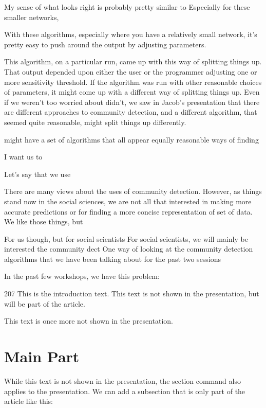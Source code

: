 My sense of what looks right is probably pretty similar to Especially for these smaller networks, 

With these algorithms, especially where you have a
relatively small network, it's pretty easy to push around the
output by adjusting parameters. 

This algorithm, on a particular run, came up with
this way of splitting things up. That output depended upon either the
user or the programmer adjusting one or more sensitivity threshold. If
the algorithm was run with other reasonable choices of parameters, it
might come up with a different way of splitting things up. Even if we weren't too worried about 
didn't, we saw in Jacob's presentation that there are different
approaches to community detection, and a different algorithm, that
seemed quite reasonable, might split things up differently.



 might have a set of algorithms that all appear equally reasonable ways of finding 






I want us to 



Let's say that we use 




There are many views about the uses of community detection. However,
as things stand now in the social sciences, we are not all that
interested in making more accurate predictions or for finding a more
concise representation of set of data. We like those things, but 

For us though,  but for social scientists
For social scientists, we will mainly be interested the community dect
One way of looking at the community detection algorithms that we have been talking about for the past two sessions

In the past few workshops, we have  this problem:




207
This is the introduction text. This text is not shown in the
presentation, but will be part of the article.

This text is once more not shown in the presentation.
\section{Main Part}
While this text is not shown in the presentation, the section command
also applies to the presentation.
We can add a subsection that is only part of the article like this:
